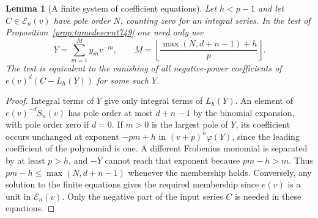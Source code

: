 \documentclass[a4paper,11pt]{article}
\newtheorem{lemma}[proposition]{Lemma}
\theoremstyle{definition}
\theoremstyle{remark}
\numberwithin{equation}{section}
\begin{document}
\begin{lemma}[A finite system of coefficient equations]
\leavevmode\label{lem:finitepoles749}
Let \(h<p-1\) and let \(C\in\mathcal E_n(v)\) have pole order
\(N\), counting zero for an integral series. In the test of
Proposition~\ref{prop:tamedescent749} one need only use
\[
  Y=\sum_{m=1}^{M}y_m v^{-m},\qquad
  M=\left\lfloor\frac{\max(N,d+n-1)+h}{p}\right\rfloor .
\]
The test is equivalent to the vanishing of all negative-power
coefficients of \(e(v)^d(C-L_h(Y))\) for some such \(Y\).
\end{lemma}
\begin{proof}
Integral terms of \(Y\) give only integral terms of \(L_h(Y)\).
An element of \(e(v)^{-d}S_n(v)\) has pole order at most
\(d+n-1\) by the binomial expansion, with pole order zero
if \(d=0\). If \(m>0\) is the largest pole of \(Y\), its
coefficient occurs unchanged at exponent \(-pm+h\) in
\((v+p)^h\varphi(Y)\), since the leading coefficient of the
polynomial is one. A different Frobenius monomial is separated
by at least \(p>h\), and \(-Y\) cannot reach that exponent
because \(pm-h>m\). Thus \(pm-h\le\max(N,d+n-1)\) whenever
the membership holds. Conversely, any solution to the finite
equations gives the required membership since \(e(v)\) is a
unit in \(\mathcal E_n(v)\). Only the negative part of the input
series \(C\) is needed in these equations.
\end{proof}
\end{document}
